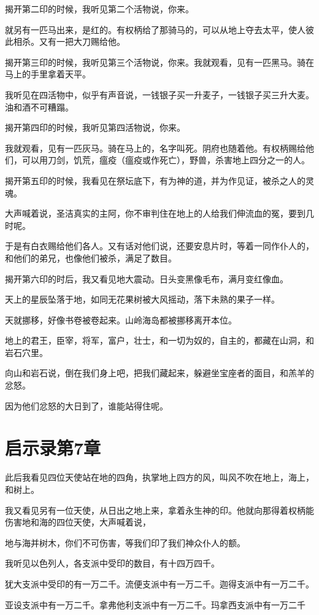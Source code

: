 \documentclass[12pt,oneside]{book}
\begin{document}
揭开第二印的时候，我听见第二个活物说，你来。

就另有一匹马出来，是红的。有权柄给了那骑马的，可以从地上夺去太平，使人彼此相杀。又有一把大刀赐给他。

揭开第三印的时候，我听见第三个活物说，你来。我就观看，见有一匹黑马。骑在马上的手里拿着天平。

我听见在四活物中，似乎有声音说，一钱银子买一升麦子，一钱银子买三升大麦。油和酒不可糟蹋。

揭开第四印的时候，我听见第四活物说，你来。

我就观看，见有一匹灰马。骑在马上的，名字叫死。阴府也随着他。有权柄赐给他们，可以用刀剑，饥荒，瘟疫（瘟疫或作死亡），野兽，杀害地上四分之一的人。

揭开第五印的时候，我看见在祭坛底下，有为神的道，并为作见证，被杀之人的灵魂。

大声喊着说，圣洁真实的主阿，你不审判住在地上的人给我们伸流血的冤，要到几时呢。

于是有白衣赐给他们各人。又有话对他们说，还要安息片时，等着一同作仆人的，和他们的弟兄，也像他们被杀，满足了数目。

揭开第六印的时后，我又看见地大震动。日头变黑像毛布，满月变红像血。

天上的星辰坠落于地，如同无花果树被大风摇动，落下未熟的果子一样。

天就挪移，好像书卷被卷起来。山岭海岛都被挪移离开本位。

地上的君王，臣宰，将军，富户，壮士，和一切为奴的，自主的，都藏在山洞，和岩石穴里。

向山和岩石说，倒在我们身上吧，把我们藏起来，躲避坐宝座者的面目，和羔羊的忿怒。

因为他们忿怒的大日到了，谁能站得住呢。

\chapter{启示录第7章}
此后我看见四位天使站在地的四角，执掌地上四方的风，叫风不吹在地上，海上，和树上。

我又看见另有一位天使，从日出之地上来，拿着永生神的印。他就向那得着权柄能伤害地和海的四位天使，大声喊着说，

地与海并树木，你们不可伤害，等我们印了我们神众仆人的额。

我听见以色列人，各支派中受印的数目，有十四万四千。

犹大支派中受印的有一万二千。流便支派中有一万二千。迦得支派中有一万二千。

亚设支派中有一万二千。拿弗他利支派中有一万二千。玛拿西支派中有一万二千
\end{document}
